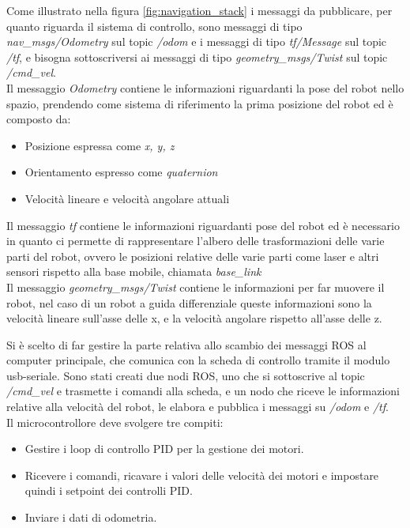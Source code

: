 \newpage
Come illustrato nella figura \ref{fig:navigation_stack} i messaggi da pubblicare, per quanto riguarda il sistema di controllo, sono messaggi di tipo \textit{nav\_msgs/Odometry} sul topic \textit{/odom} e i messaggi di tipo \textit{tf/Message} sul topic \textit{/tf}, e bisogna sottoscriversi ai messaggi di tipo \textit{geometry\_msgs/Twist} sul topic \textit{/cmd\_vel}. \\
Il messaggio \textit{Odometry} contiene le informazioni riguardanti la pose del robot nello spazio, prendendo come sistema di riferimento la prima posizione del robot ed è composto da:
\begin{itemize}
    \item Posizione espressa come \textit{x, y, z}
    \item Orientamento espresso come \textit{quaternion}
    \item Velocità lineare e velocità angolare attuali
\end{itemize}
Il messaggio \textit{tf} contiene le informazioni riguardanti pose del robot ed è necessario in quanto ci permette di rappresentare l'albero delle trasformazioni delle varie parti del robot, ovvero le posizioni relative delle varie parti come laser e altri sensori rispetto alla base mobile, chiamata \textit{base\_link} \\
Il messaggio \textit{geometry\_msgs/Twist} contiene le informazioni per far muovere il robot, nel caso di un robot a guida differenziale queste informazioni sono la velocità lineare sull'asse delle x, e la velocità angolare rispetto all'asse delle z.

Si è scelto di far gestire la parte relativa allo scambio dei messaggi ROS al computer principale, che comunica con la scheda di controllo tramite il modulo usb-seriale. 
Sono stati creati due nodi ROS, uno che si sottoscrive al topic \textit{/cmd\_vel} e trasmette i comandi alla scheda, e un nodo che riceve le informazioni relative alla velocità del robot, le elabora e pubblica i messaggi su \textit{/odom} e \textit{/tf}. \\
Il microcontrollore deve svolgere tre compiti: 
\begin{itemize}
    \item Gestire i loop di controllo PID per la gestione dei motori.
    \item Ricevere i comandi, ricavare i valori delle velocità dei motori e impostare quindi i setpoint dei controlli PID.
    \item Inviare i dati di odometria.
\end{itemize}

